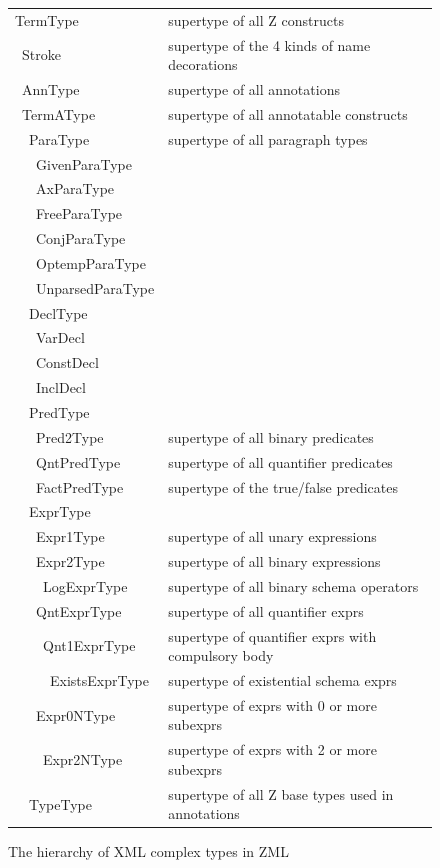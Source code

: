 \documentclass{llncs}  %
\begin{document}
\newcommand{\I}{\hbox{\ \quad}}
\begin{figure}[htbp]
\begin{footnotesize}
\begin{tabular}{ll}
TermType                  &supertype of all Z constructs \\
\I Stroke                 &supertype of the 4 kinds of name decorations\\
\I AnnType                &supertype of all annotations\\
\I TermAType              &supertype of all annotatable constructs\\
\I\I  ParaType            &supertype of all paragraph types\\
\I\I\I  GivenParaType\\
\I\I\I  AxParaType\\
\I\I\I  FreeParaType\\
\I\I\I  ConjParaType\\
\I\I\I  OptempParaType\\
\I\I\I  UnparsedParaType\\
\I\I  DeclType\\
\I\I\I  VarDecl\\
\I\I\I  ConstDecl\\
\I\I\I  InclDecl\\
\I\I  PredType\\
\I\I\I  Pred2Type         &supertype of all binary predicates\\
\I\I\I  QntPredType       &supertype of all quantifier predicates\\
\I\I\I  FactPredType      &supertype of the true/false predicates\\
\I\I  ExprType\\
\I\I\I  Expr1Type         &supertype of all unary expressions\\
\I\I\I  Expr2Type         &supertype of all binary expressions\\
\I\I\I\I  LogExprType     &supertype of all binary schema operators\\
\I\I\I  QntExprType       &supertype of all quantifier exprs\\
\I\I\I\I  Qnt1ExprType    &supertype of quantifier exprs with compulsory body\\
\I\I\I\I\I  ExistsExprType &supertype of existential schema exprs\\
\I\I\I  Expr0NType        &supertype of exprs with 0 or more subexprs\\
\I\I\I\I  Expr2NType      &supertype of exprs with 2 or more subexprs\\
\I\I  TypeType            &supertype of all Z base types used in annotations\\
\end{tabular}
\end{footnotesize}
\caption{The hierarchy of XML complex types in ZML}
\label{fig:hier}
\end{figure}
\end{document}
